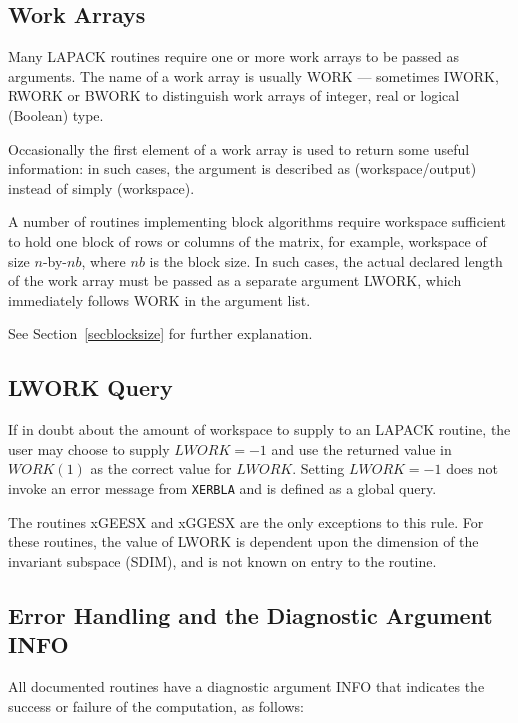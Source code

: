 \subsection{Work Arrays}\label{subsecworkspace}

Many LAPACK routines require one or more work 
arrays to be passed as
arguments. The name of a work array is usually WORK --- sometimes
IWORK, RWORK or BWORK to distinguish work arrays of
integer, real or logical (Boolean) type.

Occasionally the first element of a work array is used to return some
useful information: in such cases, the argument is described as
(workspace/output) instead of simply (workspace).

A number of routines implementing block algorithms require workspace
sufficient to hold one block of rows or columns of the matrix, 
for example, workspace
of size $n$-by-$nb$, where $nb$ is the block size. 
In such cases, the actual declared length of the work array
must be passed as a separate argument LWORK, 
which immediately follows WORK in the argument list.

See Section~\ref{secblocksize} for further explanation.

\subsection{LWORK Query}                               \label{lworkquery}
 
If in doubt about the amount of workspace to supply to an LAPACK
routine, the user may choose to supply $LWORK=-1$
and use the returned value in $WORK(1)$ as the correct value
for $LWORK$.  Setting $LWORK=-1$ does not invoke an error message
from {\tt XERBLA} and is defined as a global
query.

The routines xGEESX and xGGESX are the only exceptions to this rule.
For these routines, the value of LWORK is dependent upon the dimension
of the invariant subspace (SDIM), and is not known on entry to the routine.

\subsection{Error Handling and the Diagnostic Argument INFO}\label{subsecinfo}

All documented routines have a 
diagnostic argument INFO that
indicates the success or failure of the computation, as follows:

